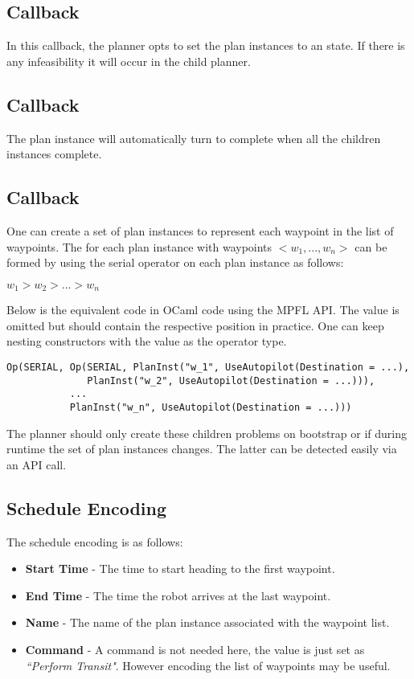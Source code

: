 \subsection{Callback }
In this callback, the planner opts to set the plan instances to an  state. If there is any infeasibility it will occur in the child planner.

\subsection{Callback }
The plan instance will automatically turn to complete when all the  children instances complete.

\subsection{Callback }
One can create a set of  plan instances to represent each waypoint in the list of waypoints. The  for each  plan instance with waypoints $<w_1,...,w_n>$ can be formed by using the serial operator on each  plan instance as follows:

\begin{center}
$w_1 > w_2 > ... > w_n$
\end{center}

Below is the equivalent code in OCaml code using the MPFL API. The  value is omitted but should contain the respective position in practice. One can keep nesting  constructors with the  value as the operator type.

\begin{verbatim}
Op(SERIAL, Op(SERIAL, PlanInst("w_1", UseAutopilot(Destination = ...), 
              PlanInst("w_2", UseAutopilot(Destination = ...))), 
           ...           
           PlanInst("w_n", UseAutopilot(Destination = ...)))
\end{verbatim}

The planner should only create these children problems on bootstrap or if during runtime the set of  plan instances changes. The latter can be detected easily via an API call.

\subsection{Schedule Encoding}
The schedule encoding is as follows:
\begin{itemize}
\item \textbf{Start Time} - The time to start heading to the first waypoint.
\item \textbf{End Time} - The time the robot arrives at the last waypoint.
\item \textbf{Name} - The name of the plan instance associated with the waypoint list.
\item \textbf{Command} - A command is not needed here, the value is just set as \emph{``Perform Transit"}. However encoding the list of waypoints may be useful.
\end{itemize}

